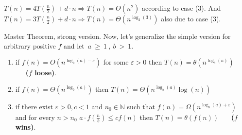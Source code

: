 \begin{example}  \( T\left(n\right)  =4T\left(\frac{n}{2}\right)+d\cdot n \Rightarrow
T\left(n\right) = \Theta\left(n^2\right)\) according to case (3). And \(T\left(n\right)  = 3T\left(\frac{n}{2}\right) + d\cdot n \Rightarrow T\left(n\right) = \Theta \left( n^{\log_{2}\left(3\right)}\right)\)
also due to case (3).
\end{example}
\begin{defbox}{Master Theorem, strong version.} 
Now, let's generalize the simple version for arbitrary positive \(f\) and let~\(a~\ge~1~,~b~>~1\). 

\newcommand{\logab}{\log_{b} \left(a\right)}

\begin{enumerate}
    \item if  \(f\left(n\right) = O \left( n^{\logab - \varepsilon }\right)\) for some \( \varepsilon > 0 \) then \( T\left(n\right) = \theta \left( n^{\logab} \right) \) \ \ \ \textbf{(\(f\) loose)}.
    
    \item if  \(f\left(n\right) = \Theta \left( n^{\logab} \right) \) then \( T\left(n\right) = \Theta \left( n^{\logab}  \log\left(n\right)\right) \)
    
    \item if there exist \(\varepsilon >0 ,c<1\) and \(n_0 \in \mathbb{N} \) such that  \(f\left(n\right) = \Omega \left( n^{\logab + \varepsilon }\right)\) and for every \( n > n_0 \) \(a \cdot f\left( \frac{n}{b} \right) \le c f\left(n\right)\)  then \( T\left(n\right) = \theta \left( f\left(n\right) \right) \) \ \ \ \textbf{(\(f\) wins)}.
    
\end{enumerate}
\end{defbox}
\newcommand{\TT}[2]{#1 T\left(\frac{n}{#2}\right)}

